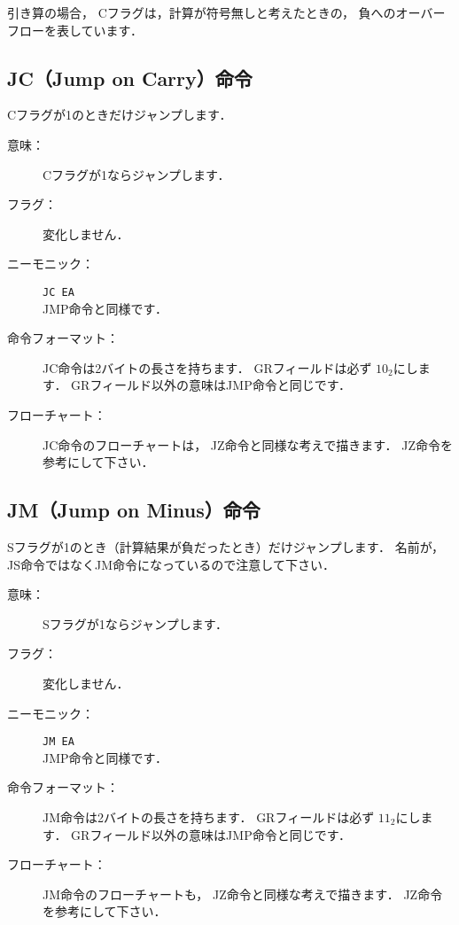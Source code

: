 \begin{framed}
{    引き算の場合，
    Cフラグは，計算が符号無しと考えたときの，
    負へのオーバーフローを表しています．
}\end{framed}

\newpage
\subsection{JC（Jump on Carry）命令}
Cフラグが1のときだけジャンプします．

\begin{description}
\item[意味：]Cフラグが1ならジャンプします．
\item[フラグ：]変化しません．
\item[ニーモニック：]\texttt{JC  EA} \\
  JMP命令と同様です．
\item[命令フォーマット：]JC命令は2バイトの長さを持ちます．
  GRフィールドは必ず $10_2$にします．
  GRフィールド以外の意味はJMP命令と同じです．


\item[フローチャート：]JC命令のフローチャートは，
  JZ命令と同様な考えで描きます．
  JZ命令を参考にして下さい．

\end{description}

\subsection{JM（Jump on Minus）命令}
Sフラグが1のとき（計算結果が負だったとき）だけジャンプします．
名前が，JS命令ではなくJM命令になっているので注意して下さい．

\begin{description}
\item[意味：]Sフラグが1ならジャンプします．

\item[フラグ：]変化しません．

\item[ニーモニック：]\texttt{JM  EA} \\
  JMP命令と同様です．

\item[命令フォーマット：]JM命令は2バイトの長さを持ちます．
  GRフィールドは必ず $11_2$にします．
  GRフィールド以外の意味はJMP命令と同じです．


\item[フローチャート：]JM命令のフローチャートも，
  JZ命令と同様な考えで描きます．
  JZ命令を参考にして下さい．
\end{description}

